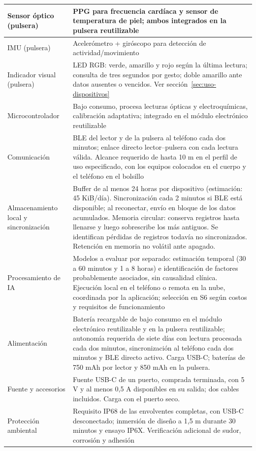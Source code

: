 {\begin{xltabular}{\textwidth}{|>{\raggedright\arraybackslash}p{0.28\textwidth}|>{\raggedright\arraybackslash}X|}
\hline
Sensor óptico (pulsera) & PPG para frecuencia cardíaca y sensor de temperatura de piel; ambos integrados en la pulsera reutilizable \\
\hline
IMU (pulsera) & Acelerómetro + giróscopo para detección de actividad/movimiento \\
\hline
Indicador visual (pulsera) & LED RGB: verde, amarillo y rojo según la última lectura; consulta de tres segundos por gesto; doble amarillo ante datos ausentes o vencidos. Ver sección~\ref{sec:uso-dispositivos}\\
\hline
Microcontrolador & Bajo consumo, procesa lecturas ópticas y electroquímicas, calibración adaptativa; integrado en el módulo electrónico reutilizable \\
\hline
Comunicación & BLE del lector y de la pulsera al teléfono cada dos minutos; enlace directo lector--pulsera con cada lectura válida. Alcance requerido de hasta 10 m en el perfil de uso especificado, con los equipos colocados en el cuerpo y el teléfono en el bolsillo \\
\hline
Almacenamiento local y sincronización & Buffer de al menos 24 horas por dispositivo (estimación: 45 KiB/día). Sincronización cada 2 minutos si BLE está disponible; al reconectar, envío en bloque de los datos acumulados. Memoria circular: conserva registros hasta llenarse y luego sobrescribe los más antiguos. Se identifican pérdidas de registros todavía no sincronizados. Retención en memoria no volátil ante apagado. \\
\hline
Procesamiento de IA & Modelos a evaluar por separado: estimación temporal (30 a 60 minutos y 1 a 8 horas) e identificación de factores probablemente asociados, sin causalidad clínica. Ejecución local en el teléfono o remota en la nube, coordinada por la aplicación; selección en S6 según costos y requisitos de funcionamiento \\
\hline
Alimentación & Batería recargable de bajo consumo en el módulo electrónico reutilizable y en la pulsera reutilizable; autonomía requerida de siete días con lectura procesada cada dos minutos, sincronización al teléfono cada dos minutos y BLE directo activo. Carga USB-C; baterías de 750 mAh por lector y 850 mAh en la pulsera. \\
\hline
Fuente y accesorios & Fuente USB-C de un puerto, comprada terminada, con 5 V y al menos 0,5 A disponibles en su salida; dos cables incluidos. Carga con el puerto seco. \\
\hline
Protección ambiental & Requisito IP68 de las envolventes completas, con USB-C desconectado; inmersión de diseño a 1,5 m durante 30 minutos y ensayo IP6X. Verificación adicional de sudor, corrosión y adhesión\\
\hline
\end{xltabular}
\par}

